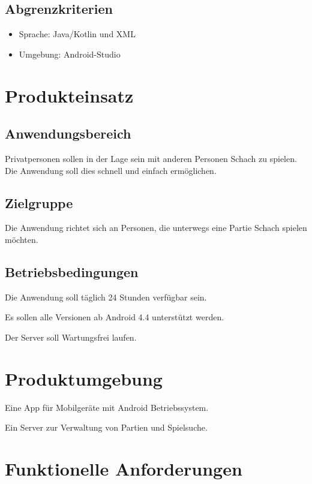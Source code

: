 \documentclass[parskip=full]{scrartcl}
\begin{document}
\subsection{Abgrenzkriterien}
\begin{itemize}[nosep]
\item Sprache: Java/Kotlin und XML
\item Umgebung: Android-Studio
\end{itemize}
\section{Produkteinsatz}
	\subsection{Anwendungsbereich}
		
			Privatpersonen sollen in der Lage sein mit anderen Personen \gls{Schach} zu spielen. Die Anwendung soll dies schnell und einfach ermöglichen.	
		
	\subsection{Zielgruppe}
		
			Die Anwendung richtet sich an Personen, die unterwegs eine Partie \gls{Schach} spielen möchten.
		
	\subsection{Betriebsbedingungen}
		\begin{description}
			\item Die Anwendung soll täglich 24 Stunden verfügbar sein.
			\item Es sollen alle Versionen ab Android 4.4 unterstützt werden.
			\item Der Server soll Wartungsfrei laufen.	
		\end{description}
\section{Produktumgebung}
	\begin{description}
		\item Eine App für Mobilgeräte mit \gls{Android} Betriebssystem.
		\item Ein Server zur Verwaltung von Partien und Spielsuche.		
	\end{description}
\section{Funktionelle Anforderungen}
\end{document}
